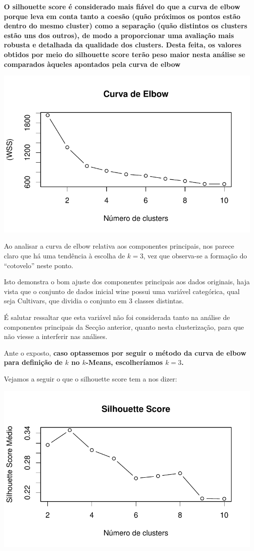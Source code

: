 \documentclass[
  letterpaper,
  DIV=11,
  numbers=noendperiod]{scrartcl}
\begin{document}
\textbf{O silhouette score é considerado mais fiável do que a curva de
elbow porque leva em conta tanto a coesão (quão próximos os pontos estão
dentro do mesmo cluster) como a separação (quão distintos os clusters
estão uns dos outros), de modo a proporcionar uma avaliação mais robusta
e detalhada da qualidade dos clusters. Desta feita, os valores obtidos
por meio do silhouette score terão peso maior nesta análise se
comparados àqueles apontados pela curva de elbow}

\includegraphics{wines_analysis_files/figure-pdf/unnamed-chunk-26-1.pdf}

Ao analisar a curva de elbow relativa aos componentes principais, nos
parece claro que há uma tendência à escolha de \(k=3\), vez que
observa-se a formação do ``cotovelo'' neste ponto.

Isto demonstra o bom ajuste dos componentes principais aos dados
originais, haja vista que o conjunto de dados inicial wine possui uma
variável categórica, qual seja Cultivars, que dividia o conjunto em 3
classes distintas.

É salutar ressaltar que esta variável não foi considerada tanto na
análise de componentes principais da Secção anterior, quanto nesta
clusterização, para que não viesse a interferir nas análises.

Ante o exposto, \textbf{caso optassemos por seguir o método da curva de
elbow para definição de \(k\) no \(k\)-Means, escolheríamos \(k=3\).}

Vejamos a seguir o que o silhouette score tem a nos dizer:

\includegraphics{wines_analysis_files/figure-pdf/unnamed-chunk-27-1.pdf}
\end{document}
